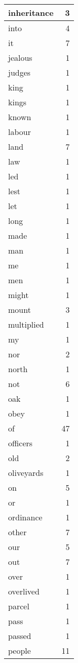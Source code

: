 \begin{center}
\begin{longtable}{l|r}
inheritance & 3\\ \hline 
into & 4\\ \hline 
it & 7\\ \hline 
jealous & 1\\ \hline 
judges & 1\\ \hline 
king & 1\\ \hline 
kings & 1\\ \hline 
known & 1\\ \hline 
labour & 1\\ \hline 
land & 7\\ \hline 
law & 1\\ \hline 
led & 1\\ \hline 
lest & 1\\ \hline 
let & 1\\ \hline 
long & 1\\ \hline 
made & 1\\ \hline 
man & 1\\ \hline 
me & 1\\ \hline 
men & 1\\ \hline 
might & 1\\ \hline 
mount & 3\\ \hline 
multiplied & 1\\ \hline 
my & 1\\ \hline 
nor & 2\\ \hline 
north & 1\\ \hline 
not & 6\\ \hline 
oak & 1\\ \hline 
obey & 1\\ \hline 
of & 47\\ \hline 
officers & 1\\ \hline 
old & 2\\ \hline 
oliveyards & 1\\ \hline 
on & 5\\ \hline 
or & 1\\ \hline 
ordinance & 1\\ \hline 
other & 7\\ \hline 
our & 5\\ \hline 
out & 7\\ \hline 
over & 1\\ \hline 
overlived & 1\\ \hline 
parcel & 1\\ \hline 
pass & 1\\ \hline 
passed & 1\\ \hline 
people & 11\\ \hline 

\end{longtable}
\end{center}
